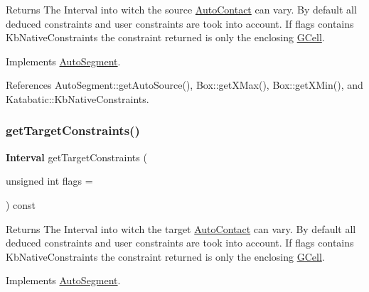 \begin{DoxyReturn}{Returns}
The Interval into witch the source \mbox{\hyperlink{classKatabatic_1_1AutoContact}{Auto\+Contact}} can vary. By default all deduced constraints and user constraints are took into account. If {\ttfamily flags} contains {\ttfamily Kb\+Native\+Constraints} the constraint returned is only the enclosing \mbox{\hyperlink{classKatabatic_1_1GCell}{G\+Cell}}. 
\end{DoxyReturn}


Implements \mbox{\hyperlink{classKatabatic_1_1AutoSegment_ab7685e309e1d910db3e8237f8a898c35}{Auto\+Segment}}.



References Auto\+Segment\+::get\+Auto\+Source(), Box\+::get\+X\+Max(), Box\+::get\+X\+Min(), and Katabatic\+::\+Kb\+Native\+Constraints.

\mbox{\label{classKatabatic_1_1AutoVertical_ad2b5aeb2604548378c8d78c60862091f}} 
\subsubsection{\texorpdfstring{get\+Target\+Constraints()}{getTargetConstraints()}}
{\footnotesize\ttfamily \textbf{ Interval} get\+Target\+Constraints (\begin{DoxyParamCaption}\item[{unsigned int}]{flags = {} }\end{DoxyParamCaption}) const\hspace{0.3cm}{\ttfamily [virtual]}}

\begin{DoxyReturn}{Returns}
The Interval into witch the target \mbox{\hyperlink{classKatabatic_1_1AutoContact}{Auto\+Contact}} can vary. By default all deduced constraints and user constraints are took into account. If {\ttfamily flags} contains {\ttfamily Kb\+Native\+Constraints} the constraint returned is only the enclosing \mbox{\hyperlink{classKatabatic_1_1GCell}{G\+Cell}}. 
\end{DoxyReturn}


Implements \mbox{\hyperlink{classKatabatic_1_1AutoSegment_a9c1b8b3cd57fb7b0bf60c7a6148237c2}{Auto\+Segment}}.



